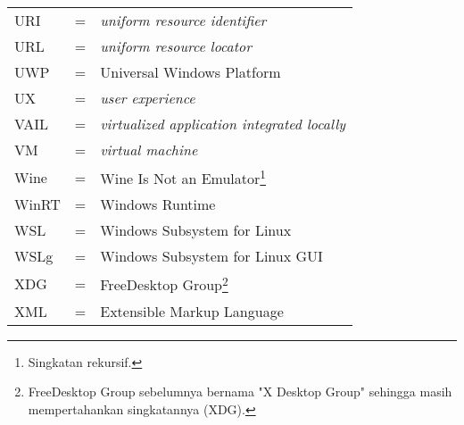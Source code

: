 \begin{longtable}{llp{3in}}
    URI & \hspace{1.5cm} = & \textit{uniform resource identifier}\\
    URL & \hspace{1.5cm} = & \textit{uniform resource locator}\\
    UWP & \hspace{1.5cm} = & Universal Windows Platform\\
    UX & \hspace{1.5cm} = & \textit{user experience}\\
    VAIL & \hspace{1.5cm} = & \textit{virtualized application integrated locally}\\
    VM & \hspace{1.5cm} = & \textit{virtual machine}\\
    Wine & \hspace{1.5cm} = & Wine Is Not an Emulator\footnote{Singkatan rekursif.}\\
    WinRT & \hspace{1.5cm} = & Windows Runtime\\
    WSL & \hspace{1.5cm} = & Windows Subsystem for Linux\\
    WSLg & \hspace{1.5cm} = & Windows Subsystem for Linux GUI\\
    XDG & \hspace{1.5cm} = & FreeDesktop Group\footnote{FreeDesktop Group sebelumnya bernama "X Desktop Group" sehingga masih mempertahankan singkatannya (XDG).}\\
    XML & \hspace{1.5cm} = & Extensible Markup Language
\end{longtable}
